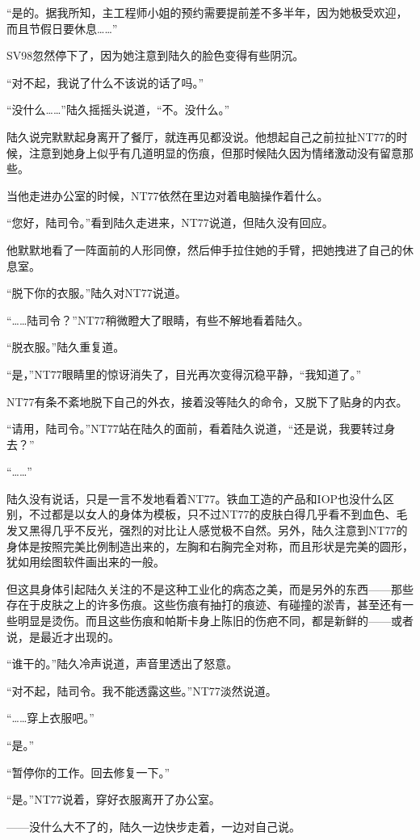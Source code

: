 “是的。据我所知，主工程师小姐的预约需要提前差不多半年，因为她极受欢迎，而且节假日要休息……”

SV98忽然停下了，因为她注意到陆久的脸色变得有些阴沉。

“对不起，我说了什么不该说的话了吗。”

“没什么……”陆久摇摇头说道，“不。没什么。”

陆久说完默默起身离开了餐厅，就连再见都没说。他想起自己之前拉扯NT77的时候，注意到她身上似乎有几道明显的伤痕，但那时候陆久因为情绪激动没有留意那些。

当他走进办公室的时候，NT77依然在里边对着电脑操作着什么。

“您好，陆司令。”看到陆久走进来，NT77说道，但陆久没有回应。

他默默地看了一阵面前的人形同僚，然后伸手拉住她的手臂，把她拽进了自己的休息室。

“脱下你的衣服。”陆久对NT77说道。

“……陆司令？”NT77稍微瞪大了眼睛，有些不解地看着陆久。

“脱衣服。”陆久重复道。

“是，”NT77眼睛里的惊讶消失了，目光再次变得沉稳平静，“我知道了。”

NT77有条不紊地脱下自己的外衣，接着没等陆久的命令，又脱下了贴身的内衣。

“请用，陆司令。”NT77站在陆久的面前，看着陆久说道，“还是说，我要转过身去？”

“……”

陆久没有说话，只是一言不发地看着NT77。铁血工造的产品和IOP也没什么区别，不过都是以女人的身体为模板，只不过NT77的皮肤白得几乎看不到血色、毛发又黑得几乎不反光，强烈的对比让人感觉极不自然。另外，陆久注意到NT77的身体是按照完美比例制造出来的，左胸和右胸完全对称，而且形状是完美的圆形，犹如用绘图软件画出来的一般。

但这具身体引起陆久关注的不是这种工业化的病态之美，而是另外的东西——那些存在于皮肤之上的许多伤痕。这些伤痕有抽打的痕迹、有碰撞的淤青，甚至还有一些明显是烫伤。而且这些伤痕和帕斯卡身上陈旧的伤疤不同，都是新鲜的——或者说，是最近才出现的。

“谁干的。”陆久冷声说道，声音里透出了怒意。

“对不起，陆司令。我不能透露这些。”NT77淡然说道。

“……穿上衣服吧。”

“是。”

“暂停你的工作。回去修复一下。”

“是。”NT77说着，穿好衣服离开了办公室。

——没什么大不了的，陆久一边快步走着，一边对自己说。


